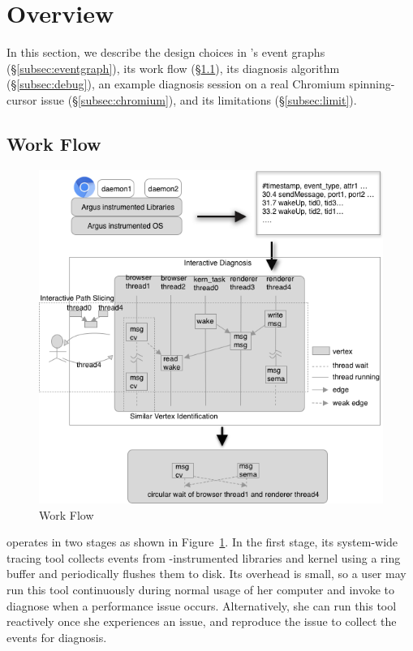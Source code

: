 \section{Overview}\label{sec:overview}

In this section, we describe the design choices in \xxx's event graphs
(\S\ref{subsec:eventgraph}), its work flow (\S\ref{subsec:overflow}), its
diagnosis algorithm (\S\ref{subsec:debug}), an example diagnosis session
on a real Chromium spinning-cursor issue (\S\ref{subsec:chromium}), and
its limitations (\S\ref{subsec:limit}).



\subsection{\xxx Work Flow} \label{subsec:overflow}

\begin{figure}[tb]
    \centering
	\includegraphics[width=\columnwidth]{./figures/Argus_overview.png}
    \caption{\xxx Work Flow}
    \label{fig:argus-overview}
\end{figure}

\xxx operates in two stages as shown in
Figure~\ref{fig:argus-overview}. In the first stage, its system-wide
tracing tool collects events from \xxx-instrumented libraries and kernel
using a ring buffer and periodically flushes them to disk.  Its overhead
is small, so a user may run this tool continuously during normal usage of
her computer and invoke \xxx to diagnose when a performance issue occurs.
Alternatively, she can run this tool reactively once she experiences an
issue, and reproduce the issue to collect the events for diagnosis.


